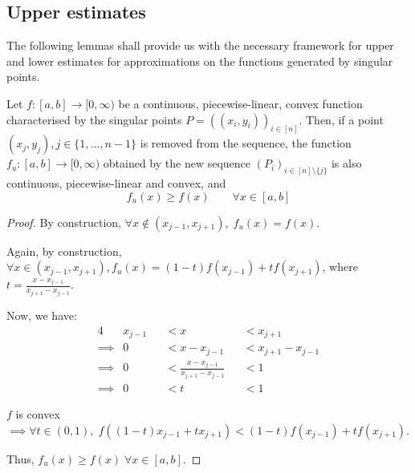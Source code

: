 \subsection{Upper estimates}
\label{sec:sp-upper-estimates}

The following lemmas shall provide us with the necessary framework for upper and lower estimates for approximations on the functions generated by singular points.

\begin{lmm}
	\label{lmm:sp-upper-estimate}
	Let $ f:[a,b] \to [0, \infty) $ be a continuous, piecewise-linear, convex function characterised by the singular points $ P = ( (x_i, y_i) )_{i \in [n]} $. Then, if a point $ (x_j, y_j), j \in \{ 1, \dots, n-1\} $ is removed from the sequence, the function $ f_u: [a,b] \to [0, \infty) $ obtained by the new sequence $ (P_i)_{i \in [n] \setminus \{ j \}} $ is also continuous, piecewise-linear and convex, and
	\begin{equation}
		f_u(x) \geq f(x) \qquad \forall x \in [a,b]
	\end{equation}
\end{lmm}

\begin{proof}
	By construction, $ \forall x \notin ( x_{j-1} , x_{j+1} ), \; f_u(x) = f(x) $.
	
	Again, by construction, $ \forall x \in ( x_{j-1} , x_{j+1} ), f_u(x) = (1-t) f(x_{j-1}) + t f(x_{j+1}) $, where $ t = \frac{ x - x_{j-1} }{ x_{j+1} - x_{j-1} } $.
	
	Now, we have:
	\begin{alignat*}{4}
		& x_{j-1} &&< x &&< x_{j+1} \\
		\implies & 0 &&< x - x_{j-1} &&< x_{j+1} - x_{j-1} \\
		\implies & 0 &&< \frac{ x - x_{j-1} }{ x_{j+1} - x_{j-1} } &&< 1 \\
		\implies & 0 &&< t &&< 1
	\end{alignat*}
	
	$f$ is convex $\implies \forall t \in (0,1), \; f( (1-t) x_{j-1} + t x_{j+1} ) < (1-t) f(x_{j-1}) + t f(x_{j+1}) $.
	
	Thus, $ f_u(x) \geq f(x) \; \forall x \in [a,b]$.
\end{proof}

